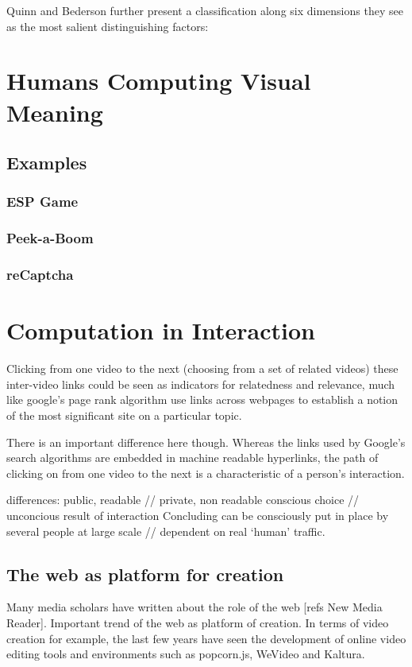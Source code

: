 Quinn and Bederson further present a classification along six dimensions they see as the most salient distinguishing factors: \cite{Quinn:2011us}


\section{Humans Computing Visual Meaning}
\subsection{Examples}
\subsubsection{ESP Game}
\subsubsection{Peek-a-Boom}
\subsubsection{reCaptcha}




\section{Computation in Interaction}


Clicking from one video to the next (choosing from a set of related videos)
these inter-video links could be seen as indicators for relatedness and relevance, much like google's page rank algorithm use links across webpages to establish a notion of the most significant site on a particular topic. 

There is an important difference here though. Whereas the links used by Google's search algorithms are embedded in machine readable hyperlinks, the path of clicking on from one video to the next is a characteristic of a person's interaction. 

differences:
	public, readable // private, non readable
	conscious choice // unconcious result of interaction
	Concluding
		can be consciously put in place by several people at large scale // dependent on real `human' traffic.



\subsection{The web as platform for creation}
\label{sec:platform}
Many media scholars have written about the role of the web [refs New Media Reader].
Important trend of the web as platform of creation. In terms of video creation for example, the last few years have seen the development of online video editing tools and environments such as popcorn.js, WeVideo and Kaltura.



